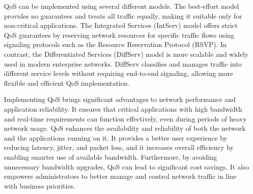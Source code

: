QoS can be implemented using several different models. The best-effort model provides no guarantees and treats all traffic equally, making it suitable only for non-critical applications. The Integrated Services (IntServ) model offers strict QoS guarantees by reserving network resources for specific traffic flows using signaling protocols such as the Resource Reservation Protocol (RSVP). In contrast, the Differentiated Services (DiffServ) model is more scalable and widely used in modern enterprise networks. DiffServ classifies and manages traffic into different service levels without requiring end-to-end signaling, allowing more flexible and efficient QoS implementation.

Implementing QoS brings significant advantages to network performance and application reliability. It ensures that critical applications with high bandwidth and real-time requirements can function effectively, even during periods of heavy network usage. QoS enhances the availability and reliability of both the network and the applications running on it. It provides a better user experience by reducing latency, jitter, and packet loss, and it increases overall efficiency by enabling smarter use of available bandwidth. Furthermore, by avoiding unnecessary bandwidth upgrades, QoS can lead to significant cost savings. It also empowers administrators to better manage and control network traffic in line with business priorities.
